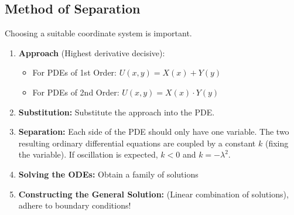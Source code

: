 
\subsection{Method of Separation}
Choosing a suitable coordinate system is important.

\begin{enumerate}
\item \textbf{Approach} (Highest derivative decisive):
	\begin{itemize}
		\item For PDEs of 1st Order: $U(x,y)=X(x) + Y(y)$
		\item For PDEs of 2nd Order: $U(x,y)=X(x) \cdot Y(y)$
	\end{itemize}
\item \textbf{Substitution: } Substitute the approach into the PDE.\@
\item \textbf{Separation: } Each side of the PDE should only have one variable.
	The two resulting ordinary differential equations are coupled by a constant $k$ (fixing the variable). If oscillation is expected, $k<0$ and $k=-\lambda^2$.
\item \textbf{Solving the ODEs: } Obtain a family of solutions
\item \textbf{Constructing the General Solution: } (Linear combination of solutions), adhere to boundary conditions!
\end{enumerate}

